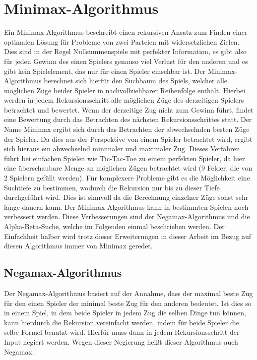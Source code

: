 \section{Minimax-Algorithmus}
Ein Minimax-Algorithmus beschreibt einen rekursiven Ansatz zum Finden einer optimalen Lösung für Probleme von zwei Parteien mit widersetzlichen Zielen. Dies sind in der Regel Nullsummenspiele mit perfekter Information, es gibt also für jeden Gewinn des einen Spielers genauso viel Verlust für den anderen und es gibt kein Spielelement, das nur für einen Spieler einsehbar ist. Der Minimax-Algorithmus berechnet sich hierfür den Suchbaum des Spiels, welcher alle möglichen Züge beider Spieler in nachvollziehbarer Reihenfolge enthält. Hierbei werden in jedem Rekursionsschritt alle möglichen Züge des derzeitigen Spielers betrachtet und bewertet. Wenn der derzeitige Zug nicht zum Gewinn führt, findet eine Bewertung durch das Betrachten des nächsten Rekursionsschrittes statt. 
Der Name Minimax ergibt sich durch das Betrachten der abwechselnden besten Züge der Spieler. Da dies aus der Perspektive von einem Spieler betrachtet wird, ergibt sich hieraus ein abwechselnd minimaler und maximaler Zug. Dieses Verfahren führt bei einfachen Spielen wie Tic-Tac-Toe zu einem perfekten Spieler\cite{borovska2007efficiency}, da hier eine überschaubare Menge an möglichen Zügen betrachtet wird (9 Felder, die von 2 Spielern gefüllt werden). Für komplexere Probleme gibt es die Möglichkeit eine Suchtiefe zu bestimmen, wodurch die Rekursion  nur bis zu dieser Tiefe durchgeführt wird. Dies ist sinnvoll da die Berechnung einzelner Züge sonst sehr lange dauern kann. Der Minimax-Algorithmus kann in bestimmten Spielen noch verbessert werden. Diese Verbesserungen sind der Negamax-Algorithmus und die Alpha-Beta-Suche, welche im Folgenden einmal beschrieben werden.  Der Einfachheit halber wird trotz dieser Erweiterungen in dieser Arbeit im Bezug auf diesen Algorithmus immer von Minimax geredet.\cite{borovska2007efficiency}

\subsection{Negamax-Algorithmus}
Der Negamax-Algorithmus basiert auf der Annahme, dass der maximal beste Zug für den einen Spieler der minimal beste Zug für den anderen bedeutet. Ist dies so in einem Spiel, in dem beide Spieler in jedem Zug die selben Dinge tun können, kann hierdurch die Rekursion vereinfacht werden, indem für beide Spieler die selbe Formel benutzt wird. Hierfür muss dann in jedem Rekursionsschritt der Input negiert werden. Wegen dieser Negierung heißt dieser Algorithmus auch Negamax.\cite{baier2006alpha}

